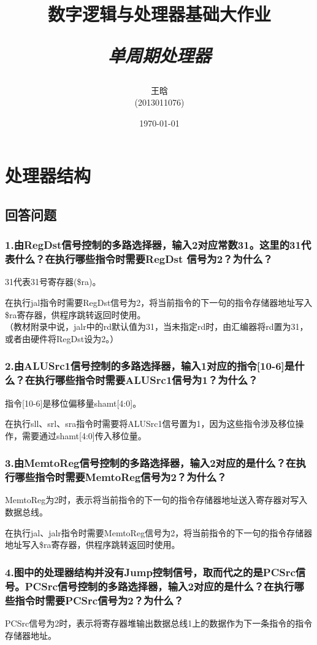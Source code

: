 \documentclass{article}
\begin{document}
	\title{数字逻辑与处理器基础大作业 \\ [2ex] \begin{large} \emph{单周期处理器} \end{large} }
	\author{王晗\\(2013011076)}
	\date{\today}
	\maketitle
	\section{处理器结构}
		\subsection{回答问题}
            \subsubsection*{1.由RegDst信号控制的多路选择器，输入2对应常数31。这里的31代表什么？在执行哪些指令时需要RegDst 信号为2？为什么？}
            31代表31号寄存器(\$ra)。

            在执行jal指令时需要RegDst信号为2，将当前指令的下一句的指令存储器地址写入\$ra寄存器，供程序跳转返回时使用。\\
            （教材附录中说，jalr中的rd默认值为31，当未指定rd时，由汇编器将rd置为31，或者由硬件将RegDst设为2。）
            \subsubsection*{2.由ALUSrc1信号控制的多路选择器，输入1对应的指令[10-6]是什么？在执行哪些指令时需要ALUSrc1信号为1？为什么？}
            指令[10-6]是移位偏移量shamt[4:0]。

            在执行sll、srl、sra指令时需要将ALUSrc1信号置为1，因为这些指令涉及移位操作，需要通过shamt[4:0]传入移位量。
            \subsubsection*{3.由MemtoReg信号控制的多路选择器，输入2对应的是什么？在执行哪些指令时需要MemtoReg信号为2？为什么？}
            MemtoReg为2时，表示将当前指令的下一句的指令存储器地址送入寄存器对写入数据总线。

            在执行jal、jalr指令时需要MemtoReg信号为2，将当前指令的下一句的指令存储器地址写入\$ra寄存器，供程序跳转返回时使用。
            \subsubsection*{4.图中的处理器结构并没有Jump控制信号，取而代之的是PCSrc信号。PCSrc信号控制的多路选择器，输入2对应的是什么？在执行哪些指令时需要PCSrc信号为2？为什么？}
            PCSrc信号为2时，表示将寄存器堆输出数据总线1上的数据作为下一条指令的指令存储器地址。
\end{document}

